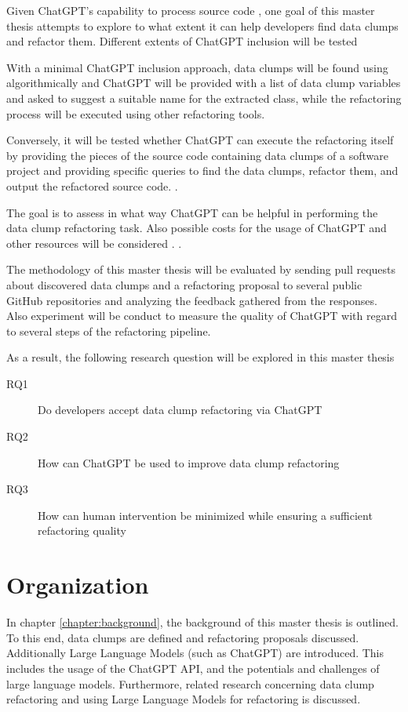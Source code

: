 Given ChatGPT's capability to process  source code \cite{sadik2023analysis}\cite{guo2023exploring}, one goal of this master thesis attempts to explore to what extent it can help developers find data clumps and refactor them. Different extents of ChatGPT inclusion will be tested  

With a minimal ChatGPT inclusion approach,  data clumps will be found using algorithmically  and ChatGPT will be provided with a list of data clump variables and asked to suggest a suitable name for the extracted class, while the refactoring process will be executed using other refactoring tools.


Conversely, it will be tested whether ChatGPT can execute the refactoring itself by providing the pieces of the source code containing data clumps of a software project and providing specific queries to find the data clumps, refactor them, and output the refactored source code. \cite{White2023ChatGPTPP}.


The goal is to assess in what way ChatGPT can be helpful in performing the data clump refactoring task. Also possible costs for the usage of ChatGPT and other resources will be considered \cite{xia2023conversation}. \cite{4ef0b456377aafb68884e643779dffb36b8e7cc1}.


The methodology of this master thesis will be evaluated by sending  pull requests about discovered data clumps and a refactoring proposal to several public GitHub repositories and analyzing the feedback gathered from the responses. Also experiment will be conduct to measure the quality of ChatGPT with regard to several steps of the refactoring pipeline.  

As a result, the following research question will be explored in this master thesis

\begin{description}
    \item [RQ1] Do developers accept data clump refactoring via ChatGPT
    \item [RQ2] How can ChatGPT be used to improve data clump refactoring
    \item [RQ3] How can human intervention be minimized while ensuring a sufficient refactoring quality
\end{description}

\section{Organization}

In chapter \ref{chapter:background}, the background of this master thesis  is outlined. To this end, data clumps are defined and refactoring proposals discussed. Additionally Large Language Models (such as ChatGPT) are introduced. This includes the usage of the ChatGPT \ac{API}, and the potentials and challenges of large language models.  Furthermore, related research concerning data clump refactoring and using Large Language Models for refactoring is discussed. 

